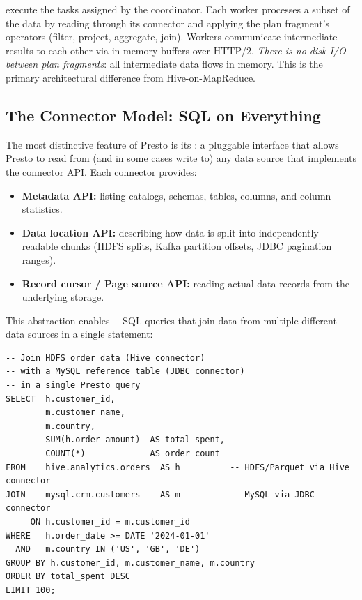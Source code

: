  execute the tasks assigned by the coordinator. Each worker
processes a subset of the data by reading through its connector and
applying the plan fragment's operators (filter, project, aggregate, join).
Workers communicate intermediate results to each other via in-memory
buffers over HTTP/2. \emph{There is no disk I/O between plan fragments}:
all intermediate data flows in memory. This is the primary architectural
difference from Hive-on-MapReduce.

\subsection{The Connector Model: SQL on Everything}
\label{subsec:connectors}

The most distinctive feature of Presto is its :
a pluggable interface that allows Presto to read from (and in some cases
write to) any data source that implements the connector API. Each connector
provides:
\begin{itemize}
  \item \textbf{Metadata API:} listing catalogs, schemas, tables, columns,
        and column statistics.
  \item \textbf{Data location API:} describing how data is split into
        independently-readable chunks (HDFS splits, Kafka partition
        offsets, JDBC pagination ranges).
  \item \textbf{Record cursor / Page source API:} reading actual data
        records from the underlying storage.
\end{itemize}

This abstraction enables ---SQL queries that
join data from multiple different data sources in a single statement:

\begin{lstlisting}[style=hiveql, caption={Presto federated query: joining HDFS data with a MySQL table}]
-- Join HDFS order data (Hive connector)
-- with a MySQL reference table (JDBC connector)
-- in a single Presto query
SELECT  h.customer_id,
        m.customer_name,
        m.country,
        SUM(h.order_amount)  AS total_spent,
        COUNT(*)             AS order_count
FROM    hive.analytics.orders  AS h          -- HDFS/Parquet via Hive connector
JOIN    mysql.crm.customers    AS m          -- MySQL via JDBC connector
     ON h.customer_id = m.customer_id
WHERE   h.order_date >= DATE '2024-01-01'
  AND   m.country IN ('US', 'GB', 'DE')
GROUP BY h.customer_id, m.customer_name, m.country
ORDER BY total_spent DESC
LIMIT 100;
\end{lstlisting}


